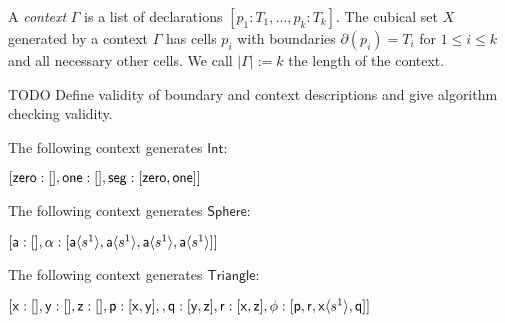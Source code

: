 \documentclass{llncs}
\newcommand{\continuation}{??}
\newenvironment{examplecontd}[1]
{\renewcommand{\continuation}{\ref{#1}}\expcont[continued]}
{\endexpcont}
\newcommand{\todo}[1]{
  \begin{tcolorbox}
    TODO {#1} 
  \end{tcolorbox}
}
\newcommand{\mdef}{:=}
\newcommand{\mname}[1]{\textit{{#1}}}
\newcommand{\mlist}[1]{[ {#1} ]}
\newcommand{\ctxtdim}[1]{|{#1}|}
\newcommand{\smap}[1]{s^{{#1}}}
\newcommand{\cont}[2]{\ensuremath{ \ifthenelse{\equal{#2}{}}{#1}{{#1}\langle{#2}\rangle}} }
\newcommand{\cset}[1]{\ensuremath{\mathsf{{#1}}}}
\newcommand{\boundary}[1]{\partial({#1})}
\newcommand{\substtwo}[2]{\tiny
  \arraycolsep=.4pt\def\arraystretch{1}
  \begin{array}{ll}
    0 &\mapsto {#1} \\
    1 &\mapsto {#2}
  \end{array}
}
\newcommand{\oneconst}{\smap{1}}
\newcommand{\oneid}{\substtwo{0}{1}}
\begin{document}


\begin{definition}
  A \mname{context} $\Gamma$ is a list of declarations $\mlist{ p_1 : T_1 ,
    \ldots , p_k : T_k}$. The cubical set $X$ generated by a context $\Gamma$
  has cells $p_i$ with boundaries $\boundary{p_i} = T_i$ for $1 \leq i \leq k$
  and all necessary other cells. We call $\ctxtdim{\Gamma} \mdef k$ the length
  of the context.
\end{definition}

\todo{Define validity of boundary and context descriptions and give algorithm
  checking validity.
}

\begin{examplecontd}{exp:int}
  The following context generates $\cset{Int}$:
  
  $\mlist{ \cset{zero} : \mlist{} , \cset{one} : \mlist{} , \cset{seg} : \mlist{
      \cont{\cset{zero}}{}, \cont{\cset{one}}{} }}$
\end{examplecontd}

\begin{examplecontd}{exp:sndsphere}
  The following context generates $\cset{Sphere}$:

  $\mlist{ \cset{a} : \mlist{} , \cset{\alpha} : \mlist{ \cont{\cset{a}}{\oneconst} , \cont{\cset{a}}{\oneconst} ,
  \cont{\cset{a}}{\oneconst}, \cont{\cset{a}}{\oneconst} }}$
  
\end{examplecontd}

\begin{examplecontd}{exp:triangle}
  The following context generates $\cset{Triangle}$:
  

  $\mlist{ \cset{x} : \mlist{} , \cset{y} : \mlist{} , \cset{z} : \mlist{} ,
    \cset{p} : \mlist{ \cset{x}, \cset{y}  } ,
    , \cset{q} : \mlist{ \cset{y}, \cset{z} }
    , \cset{r} : \mlist{ \cset{x}, \cset{z} }
    , \cset{\phi} : \mlist{ \cset{p} , \cset{r} ,
      \cont{\cset{x}}{\oneconst}, \cset{q} }
  }$

\end{examplecontd}
\end{document}
